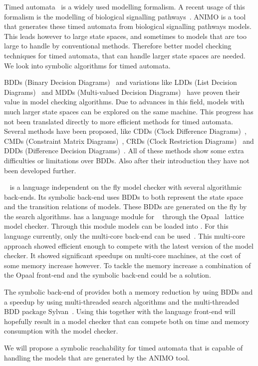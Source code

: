 Timed automata~\cite{Alur1994183} is a widely used modelling formalism. A recent usage of this formalism is the modelling of biological signalling pathways~\cite{SchivoSWCVKLPP12}. ANIMO is a tool that generates these timed automata from biological signalling pathways models. This leads however to large state spaces, and sometimes to models that are too large to handle by conventional methods. Therefore better model checking techniques for timed automata, that can handle larger state spaces are needed. We look into symbolic algorithms for timed automata.

BDDs (Binary Decision Diagrams)~\cite{Akers:1978:BDD:1310167.1310815,1676819} and variations like LDDs (List Decision Diagrams)~\cite{so62465} and MDDs (Multi-valued Decision Diagrams)~\cite{129849} have proven their value in model checking algorithms. Due to advances in this field, models with much larger state spaces can be explored on the same machine. This progress has not been translated directly to more efficient methods for timed automata. Several methods have been proposed, like CDDs (Clock Difference Diagrams)~\cite{BRICS19491}, CMDs (Constraint Matrix Diagrams)~\cite{5702245}, CRDs (Clock Restriction Diagrams)~\cite{crds} and DDDs (Difference Decision Diagrams)~\cite{ddds, ddd-datastructure-99}. All of these methods show some extra difficulties or limitations over BDDs. Also after their introduction they have not been developed further.

\ltsmin{}~\cite{eemcs18152,ltsmin-mc:nmf2011} is a language independent on the fly model checker with several algorithmic back-ends. Its symbolic back-end uses BDDs to both represent the state space and the transition relations of models. These BDDs are generated on the fly by the search algorithms. \ltsmin{} has a language module for \uppaal{}~\cite{UPPAAL} through the Opaal~\cite{opaal} lattice model checker. Through this module \uppaal{} models can be loaded into \ltsmin{}. For this language currently, only the multi-core back-end can be used~\cite{eemcs21972}. This multi-core approach showed efficient enough to compete with the latest version of the \uppaal{} model checker. It showed significant speedups on multi-core machines, at the cost of some memory increase however. To tackle the memory increase a combination of the Opaal front-end and the symbolic back-end could be a solution.

The symbolic back-end of \ltsmin{} provides both a memory reduction by using BDDs and a speedup by using multi-threaded search algorithms and the multi-threaded BDD package Sylvan~\cite{sylvan}. Using this together with the \uppaal{} language front-end will hopefully result in a model checker that can compete both on time and memory consumption with the \uppaal{} model checker.

We will propose a symbolic reachability for timed automata that is capable of handling the models that are generated by the ANIMO tool.